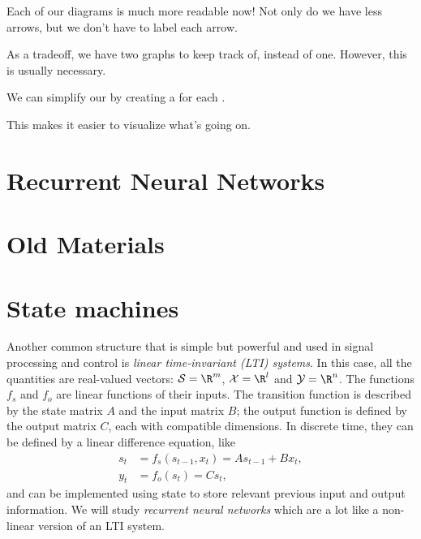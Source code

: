             Each of our diagrams is much more readable now! Not only do we have less arrows, but we don't have to label each arrow.
            
            As a tradeoff, we have two graphs to keep track of, instead of one. However, this is usually necessary.
                \\
                
            \begin{concept}
                We can simplify our  by creating a  for each .
                
                This makes it easier to visualize what's going on.
            \end{concept}
\section{Recurrent Neural Networks}    
            
            
        
        
        
        

\section{Old Materials}


\section{State machines}
\label{sec:state_machines}


Another common structure that is simple but powerful and used in
signal processing and control is {\em linear time-invariant (LTI)
  systems}.  In this case, all
the quantities are real-valued vectors: $\mathcal S = \R^m$, $\mathcal
X = \R^l$ and $\mathcal Y = \R^n$. The functions $f_s$ and $f_o$ are
linear functions of their inputs. 
The transition function is described by the state matrix $A$ and the input matrix $B$; 
the output function is defined by the output matrix $C$, each with compatible dimensions.
In discrete time, they can be
defined by a linear difference equation, like
\begin{align}
 s_t &= f_s(s_{t-1}, x_t) = A s_{t-1} + B x_t, \\
 y_t &= f_o(s_t) = C s_t, \;\;
\end{align}
and can be implemented using state to store relevant previous
input and output information.
We will study {\it{recurrent neural networks}} which are a lot like a
non-linear version of an LTI system.

